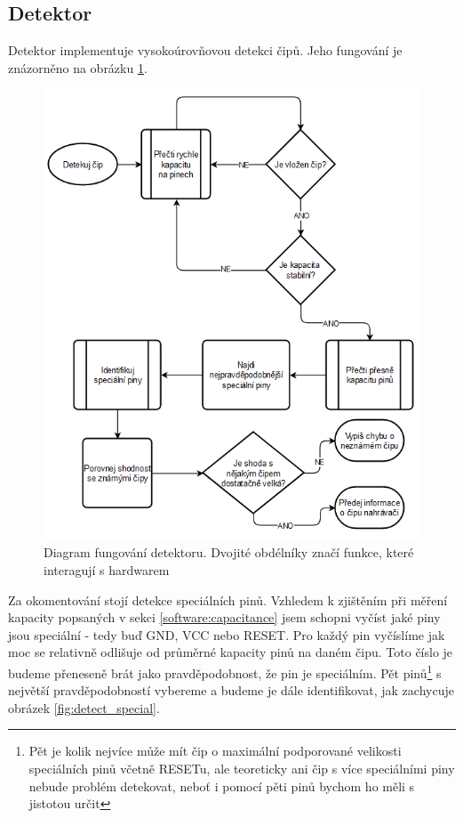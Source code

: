 \documentclass[11pt,a4paper,twoside,openright]{report}
\begin{document}
\subsection {Detektor}

Detektor implementuje vysokoúrovňovou detekci čipů. Jeho fungování je znázorněno na obrázku \ref{fig:detector}. 

\begin{figure}[ht!]
  \includegraphics[width=0.8\linewidth]{img/detector_diagram.png}
  \centering
  \caption{Diagram fungování detektoru. Dvojité obdélníky značí funkce, které interagují s hardwarem}
  \label{fig:detector}
\end{figure}

Za okomentování stojí detekce speciálních pinů. Vzhledem k zjištěním při měření kapacity popsaných v sekci \ref{software:capacitance} jsem schopni vyčíst jaké piny jsou speciální - tedy buď GND, VCC nebo RESET. Pro každý pin vyčíslíme jak moc se relativně odlišuje od průměrné kapacity pinů na daném čipu. Toto číslo je budeme přeneseně brát jako pravděpodobnost, že pin je speciálním. Pět pinů\footnote{Pět je kolik nejvíce může mít čip o maximální podporované velikosti speciálních pinů včetně RESETu, ale teoreticky ani čip s více speciálními piny nebude problém detekovat, neboť i pomocí pěti pinů bychom ho měli s jistotou určit} s největší pravděpodobností vybereme a budeme je dále identifikovat, jak zachycuje obrázek \ref{fig:detect_special}.
\end{document}
